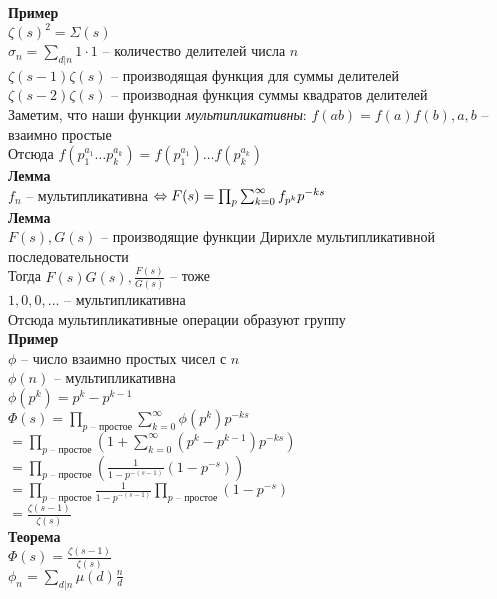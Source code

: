 \documentclass[12pt]{article}
\begin{document}
\textbf{Пример}\\
$\zeta(s)^2 = \Sigma(s)$\\
$\sigma_n = \sum_{d|n} 1\cdot 1$ -- количество делителей числа $n$\\
$\zeta(s-1)\zeta(s)$ -- производящая функция для суммы делителей\\
$\zeta(s-2)\zeta(s)$ -- производная функция суммы квадратов делителей\\
Заметим, что наши функции \textit{мультипликативны}: $f(ab)=f(a)f(b), a,b$ -- взаимно простые\\
Отсюда $f(p_1^{a_1}\ldots p_k^{a_k}) = f(p_1^{a_1}) \ldots f(p_k^{a_k})$\\
\textbf{Лемма}\\
$f_n$ -- мультипликативна $\Leftrightarrow F(s) = \prod_{p} \sum_{k=0}^\infty f_{p^k} p^{-ks}$\\
\textbf{Лемма}\\
$F(s), G(s)$ -- производящие функции Дирихле мультипликативной последовательности\\
Тогда $F(s)G(s), \frac{F(s)}{G(s)}$ -- тоже\\
$1, 0, 0, \ldots$ -- мультипликативна\\
Отсюда мультипликативные операции образуют группу\\
\textbf{Пример}\\
$\phi$ -- число взаимно простых чисел с $n$\\
$\phi(n)$ -- мультипликативна\\
$\phi(p^k) = p^k - p^{k-1}$\\
$\Phi(s) = \prod_{p\text{ -- простое}} \sum_{k=0}^\infty \phi(p^k) p^{-ks}$\\
$= \prod_{p\text{ -- простое}} (1 + \sum_{k=0}^\infty (p^k - p^{k-1}) p^{-ks})$\\
$= \prod_{p\text{ -- простое}} (\frac1{1-p^{-(s-1)}}(1-p^{-s}))$\\
$= \prod_{p\text{ -- простое}} \frac1{1-p^{-(s-1)}} \prod_{p\text{ -- простое}} (1-p^{-s})$\\
$= \frac{\zeta(s-1)}{\zeta(s)}$\\
\textbf{Теорема}\\
$\Phi(s) = \frac{\zeta(s-1)}{\zeta(s)}$\\
$\phi_n = \sum_{d|n} \mu(d) \frac nd$ 
\end{document}
